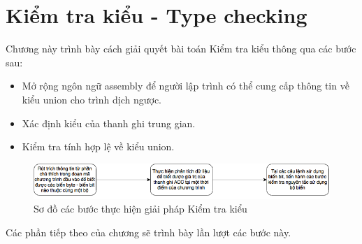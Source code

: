 \chapter{Kiểm tra kiểu - Type checking}
\label{chap:typechecking}
Chương này trình bày cách giải quyết bài toán Kiểm tra kiểu thông qua các bước sau:
\begin{itemize}
\item Mở rộng ngôn ngữ assembly để người lập trình có thể cung cấp thông tin về kiểu union cho trình dịch ngược.
\item Xác định kiểu của thanh ghi trung gian.
\item Kiểm tra tính hợp lệ về kiểu union.
\end{itemize}
\begin{figure}[h!]
	\centering
	\includegraphics[width=0.7\linewidth]{image/soDoTypeChecking}
	\caption{Sơ đồ các bước thực hiện giải pháp Kiểm tra kiểu}
	\label{fig:sodotypechecking}
\end{figure}

Các phần tiếp theo của chương sẽ trình bày lần lượt các bước này.

